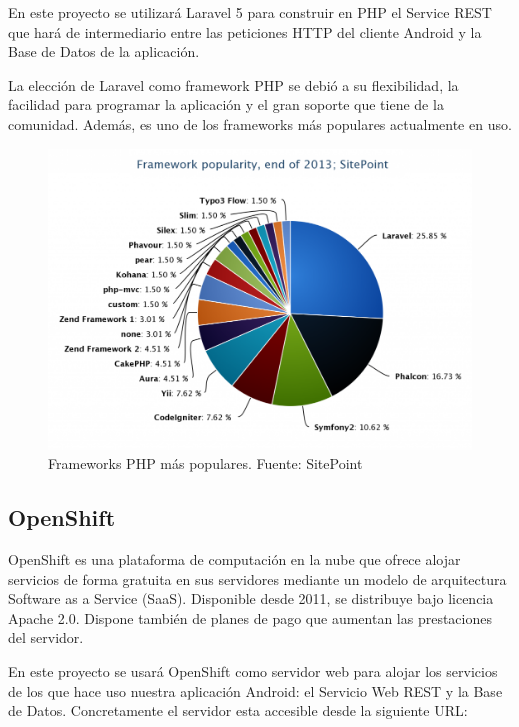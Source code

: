 	En este proyecto se utilizará Laravel 5 para construir en PHP el Service REST que hará de intermediario entre las peticiones HTTP del cliente Android y la Base de Datos de la aplicación.
	
	La elección de Laravel como framework PHP se debió a su flexibilidad, la facilidad para programar la aplicación y el gran soporte que tiene de la comunidad. Además, es uno de los frameworks más populares actualmente en uso.
	
\begin{figure}[!]
\centering
\includegraphics[keepaspectratio, scale=0.372]{Media/Captures/frameworkPopularity.png}
\caption{Frameworks PHP más populares. Fuente: SitePoint}
\label{fig:laravel5popularity}
\end{figure}
    
    \subsection{OpenShift}\label{ssec:openshift}
    
	OpenShift \cite{ref:OpenShift} es una plataforma de computación en la nube que ofrece alojar servicios de forma gratuita en sus servidores mediante un modelo de arquitectura Software as a Service (SaaS). Disponible desde 2011, se distribuye bajo licencia Apache 2.0. Dispone también de planes de pago que aumentan las prestaciones del servidor.
	
	En este proyecto se usará OpenShift como servidor web para alojar los servicios de los que hace uso nuestra aplicación Android: el Servicio Web REST y la Base de Datos. Concretamente el servidor esta accesible desde la siguiente URL:
	

